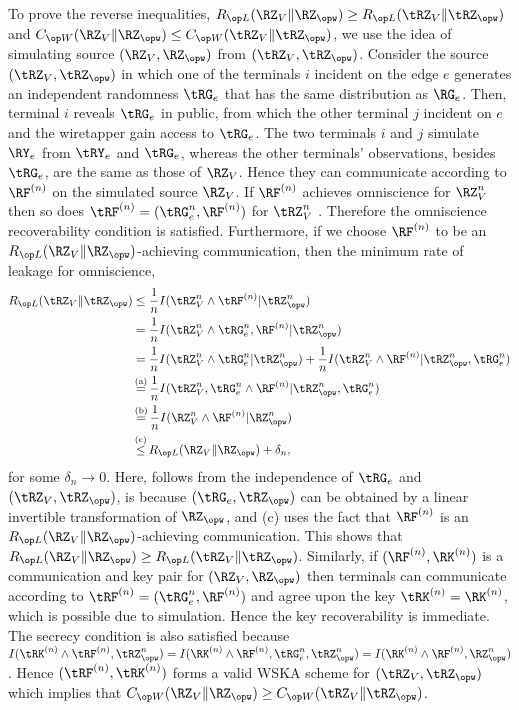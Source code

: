 To prove the  reverse inequalities, $\rl(\RZ_V\|\RZ_{\opw}) \geq \rl(\tRZ_V\|\tRZ_{\opw})$ and $\wskc(\RZ_V\| \RZ_{\opw}) \leq \wskc(\tRZ_V\|\tRZ_{\opw})$, we use the idea of simulating  source $(\RZ_V, \RZ_{\opw})$ from  $(\tRZ_V,\tRZ_{\opw})$. Consider the source $(\tRZ_V,\tRZ_{\opw})$ in which one of the terminals $i$ incident on the edge $e$ generates an independent randomness $\tRG_e$ that has the same distribution as $\RG_e$. Then, terminal $i$ reveals $\tRG_e$ in public, from which the other terminal $j$ incident on $e$ and the wiretapper gain access to $\tRG_e$. The two terminals $i$ and $j$ simulate $\RY_e$ from $\tRY_e$ and $\tRG_e$, whereas the other terminals' observations, besides $\tRG_e$, are the same as those of $\RZ_V$.  Hence  they can communicate according to $\RF^{(n)}$ on the simulated source $\RZ_V$.  If  $\RF^{(n)}$  achieves omniscience for $\RZ_V^n$ then so does $\tRF^{(n)}=(\tRG_e^n, \RF^{(n)})$ for $\tRZ_V^n$ . Therefore the omniscience recoverability condition is satisfied. Furthermore, if we choose $\RF^{(n)}$ to be an $\rl(\RZ_V\|\RZ_{\opw})$-achieving communication, then the minimum  rate of leakage for omniscience,
\begin{align*}
\rl(\tRZ_V\|\tRZ_{\opw})&\leq \frac{1}{n}I(\tRZ_V^n\wedge  \tRF^{(n)}|\tRZ_{\opw}^n)\\
&= \frac{1}{n}I(\tRZ_V^n\wedge  \tRG_e^n, \RF^{(n)}|\tRZ_{\opw}^n)\\
&= \frac{1}{n}I(\tRZ_V^n\wedge  \tRG_e^n|\tRZ_{\opw}^n)+\frac{1}{n}I(\tRZ_V^n\wedge  \RF^{(n)}|\tRZ_{\opw}^n,\tRG_e^n)\\
&\utag{a}= \frac{1}{n}I(\tRZ_V^n,\tRG_e^n\wedge  \RF^{(n)}|\tRZ_{\opw}^n,\tRG_e^n) \\
&\utag{b}= \frac{1}{n}I(\RZ_V^n\wedge  \RF^{(n)}|\RZ_{\opw}^n) \\
&\utag{c}\leq \rl(\RZ_V\|\RZ_{\opw})+\delta_n,
\end{align*}
for some $\delta_n \to 0$. Here,  follows from the independence of $\tRG_e$ and $(\tRZ_V, \tRZ_{\opw})$,  is because $(\tRG_e, \tRZ_{\opw})$ can be obtained by a linear invertible transformation of $\RZ_{\opw}$, and (c) uses the fact that $\RF^{(n)}$ is an $\rl(\RZ_V\|\RZ_{\opw})$-achieving communication.
This shows that $\rl(\RZ_V\|\RZ_{\opw}) \geq \rl(\tRZ_V\|\tRZ_{\opw})$. Similarly, if  $(\RF^{(n)}, \RK^{(n)})$ is a communication and key pair for $(\RZ_V, \RZ_{\opw})$ then terminals can communicate according to  $\tRF^{(n)}= (\tRG_e^n, \RF^{(n)})$ and agree upon the key $\tRK^{(n)}= \RK^{(n)}$, which is possible due to simulation. Hence the key recoverability is immediate. The secrecy condition is also satisfied because $ I(\tRK^{(n)}\wedge  \tRF^{(n)}, \tRZ_{\opw}^n) = I(\RK^{(n)}\wedge  \RF^{(n)}, \tRG_e^n, \tRZ_{\opw}^n) = I(\RK^{(n)}\wedge  \RF^{(n)}, \RZ_{\opw}^n) $. Hence $(\tRF^{(n)},\tRK^{(n)})$ forms a valid WSKA scheme for $(\tRZ_V, \tRZ_{\opw})$ which implies that $\wskc(\RZ_V\| \RZ_{\opw}) \geq \wskc(\tRZ_V\|\tRZ_{\opw})$.


